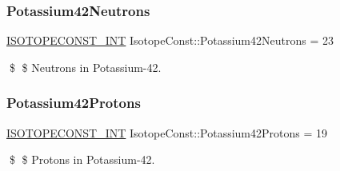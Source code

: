\subsubsection{\texorpdfstring{Potassium42\+Neutrons}{Potassium42Neutrons}}
{\footnotesize\ttfamily \mbox{\hyperlink{group___isotope_const-_macros_ga5f18360b3e99483a35c32d789e62621c}{I\+S\+O\+T\+O\+P\+E\+C\+O\+N\+S\+T\+\_\+\+I\+NT}} Isotope\+Const\+::\+Potassium42\+Neutrons = 23}

\$ \$ Neutrons in Potassium-\/42. \mbox{\label{group___isotope_const-_potassium-_k42_gacb57a8d6781c66b6835857361ef71da6}} 
\subsubsection{\texorpdfstring{Potassium42\+Protons}{Potassium42Protons}}
{\footnotesize\ttfamily \mbox{\hyperlink{group___isotope_const-_macros_ga5f18360b3e99483a35c32d789e62621c}{I\+S\+O\+T\+O\+P\+E\+C\+O\+N\+S\+T\+\_\+\+I\+NT}} Isotope\+Const\+::\+Potassium42\+Protons = 19}

\$ \$ Protons in Potassium-\/42. 